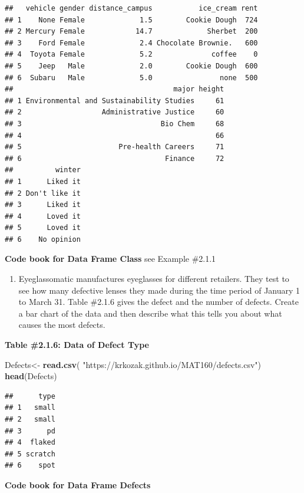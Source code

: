 \documentclass[
]{book}
\newenvironment{Shaded}{\begin{snugshade}}{\end{snugshade}}
\newcommand{\KeywordTok}[1]{\textcolor[rgb]{0.13,0.29,0.53}{\textbf{#1}}}
\newcommand{\NormalTok}[1]{#1}
\newcommand{\StringTok}[1]{\textcolor[rgb]{0.31,0.60,0.02}{#1}}
\providecommand{\tightlist}{%
  \setlength{\itemsep}{0pt}\setlength{\parskip}{0pt}}
\begin{document}
\begin{verbatim}
##   vehicle gender distance_campus           ice_cream rent
## 1    None Female             1.5        Cookie Dough  724
## 2 Mercury Female            14.7             Sherbet  200
## 3    Ford Female             2.4 Chocolate Brownie.   600
## 4  Toyota Female             5.2              coffee    0
## 5    Jeep   Male             2.0        Cookie Dough  600
## 6  Subaru   Male             5.0                none  500
##                                      major height
## 1 Environmental and Sustainability Studies     61
## 2                   Administrative Justice     60
## 3                                 Bio Chem     68
## 4                                              66
## 5                       Pre-health Careers     71
## 6                                  Finance     72
##          winter
## 1      Liked it
## 2 Don't like it
## 3      Liked it
## 4      Loved it
## 5      Loved it
## 6    No opinion
\end{verbatim}

\textbf{Code book for Data Frame Class} see Example \#2.1.1

\begin{enumerate}
\def\labelenumi{\arabic{enumi}.}
\setcounter{enumi}{4}
\tightlist
\item
  Eyeglassomatic manufactures eyeglasses for different retailers. They test to see how many defective lenses they made during the time period of January 1 to March 31. Table \#2.1.6 gives the defect and the number of defects. Create a bar chart of the data and then describe what this tells you about what causes the most defects.
\end{enumerate}

\textbf{Table \#2.1.6: Data of Defect Type}

\begin{Shaded}
\begin{Highlighting}[]
\NormalTok{Defects<-}\StringTok{ }\KeywordTok{read.csv}\NormalTok{(}
  \StringTok{"https://krkozak.github.io/MAT160/defects.csv"}\NormalTok{) }
\KeywordTok{head}\NormalTok{(Defects)}
\end{Highlighting}
\end{Shaded}

\begin{verbatim}
##      type
## 1   small
## 2   small
## 3      pd
## 4  flaked
## 5 scratch
## 6    spot
\end{verbatim}

\textbf{Code book for Data Frame Defects}
\end{document}
